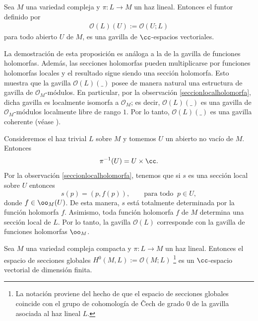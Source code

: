 	\begin{propo}
		Sea $M$ una variedad compleja y $\pi:L\to M$ un haz lineal. Entonces el funtor definido por
		\begin{align*}
			\mathcal{O}(L)(U):=\mathcal{O}(U;L)
		\end{align*}
		para todo abierto $U$ de $M$, es una gavilla de $\cc$-espacios vectoriales.
	\end{propo}
	
	La demostración de esta proposición es análoga a la de la gavilla de funciones holomorfas. Además, las secciones holomorfas pueden multiplicarse por funciones holomorfas locales y el resultado sigue siendo una sección holomorfa. Esto muestra que la gavilla $\mathcal{O}(L)(\_)$ posee de manera natural una estructura de gavilla de $\mathcal{O}_M$-módulos. En particular, por la observación \ref{seccionlocalholomorfa}, dicha gavilla es localmente isomorfa a $\mathcal{O}_M$; es decir, $\mathcal{O}(L)(\_)$ es una gavilla de $\mathcal{O}_M$-módulos localmente libre de rango $1$. Por lo tanto, $\mathcal{O}(L)(\_)$ es una gavilla coherente (véase \parencite[Chap.~5, Sec.~3.4]{griffiths}).

	\begin{example}\label{seccionesdeltrivial}
		Consideremos el haz trivial $L$ sobre $M$ y tomemos $U$ un abierto no vacío de $M$. Entonces
		\begin{equation*}
			\pi^{-1}(U)= U\times \cc.
		\end{equation*}
		Por la observación \ref{seccionlocalholomorfa}, tenemos que si $s$ es una sección local sobre $U$ entonces
		\begin{equation*}
			s(p)=(p,f(p)),\qquad \text{para todo }\ p\in U,
		\end{equation*}
		donde $f\in\oo_M(U)$. De esta manera, $s$ está totalmente determinada por la función holomorfa $f$. Asimismo, toda función holomorfa $f$ de $M$ determina una sección local de $L$. Por lo tanto, la gavilla $\mathcal{O}(L)$ corresponde con la gavilla de funciones holomorfas $\oo_M$.
	\end{example}
	
	\begin{theorem}
		Sea $M$ una variedad compleja compacta y $\pi:L\to M$ un haz lineal. Entonces el espacio de secciones globales $	H^0(M,L):=\mathcal{O}(M;L)$ \footnote{La notación proviene del hecho de que el espacio de secciones globales coincide con el grupo de cohomología de Čech de grado $0$ de la gavilla asociada al haz lineal $L$.} es un $\cc$-espacio vectorial de dimensión finita.
	\end{theorem}
	
